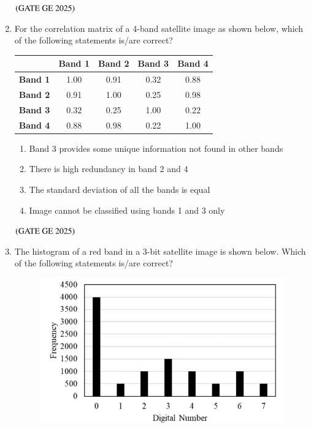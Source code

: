 \documentclass[journal,12pt,onecolumn]{IEEEtran}
\theoremstyle{remark}
\begin{document}
\begin{enumerate}
\begin{enumerate}
\end{enumerate}
\hfill $\left(\text{GATE GE 2025}\right)$
\bigskip
\item For the correlation matrix of a 4-band satellite image as shown below, which of the following statements is/are correct?
\begin{table}[H]
\centering
\begin{tabular}{|c|c|c|c|c|}
\hline
\textbf{} & \textbf{Band 1} & \textbf{Band 2} & \textbf{Band 3} & \textbf{Band 4} \\ \hline
\textbf{Band 1} & 1.00 & 0.91 & 0.32 & 0.88 \\ \hline
\textbf{Band 2} & 0.91 & 1.00 & 0.25 & 0.98 \\ \hline
\textbf{Band 3} & 0.32 & 0.25 & 1.00 & 0.22 \\ \hline
\textbf{Band 4} & 0.88 & 0.98 & 0.22 & 1.00 \\ \hline
\end{tabular}
\end{table}
\begin{enumerate}
\item Band 3 provides some unique information not found in other bands
\item There is high redundancy in band 2 and 4
\item The standard deviation of all the bands is equal
\item Image cannot be classified using bands 1 and 3 only
\end{enumerate}
\hfill $\left(\text{GATE GE 2025}\right)$
\bigskip
\item The histogram of a red band in a 3-bit satellite image is shown below. Which of the following statements is/are correct?
\begin{figure}[H]
    \centering
    \includegraphics[width=0.6\columnwidth]{figs/fig14.png}

\end{figure}
\end{enumerate}
\end{document}

